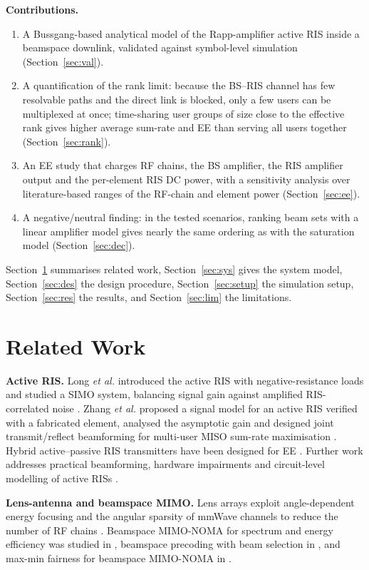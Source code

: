 \documentclass{ieeeaccess}
\begin{document}
\textbf{Contributions.}
\begin{enumerate}
\item A Bussgang-based analytical model of the Rapp-amplifier active RIS inside a beamspace downlink, validated against symbol-level simulation (Section~\ref{sec:val}).
\item A quantification of the rank limit: because the BS--RIS channel has few resolvable paths and the direct link is blocked, only a few users can be multiplexed at once; time-sharing user groups of size close to the effective rank gives higher average sum-rate and EE than serving all users together (Section~\ref{sec:rank}).
\item An EE study that charges RF chains, the BS amplifier, the RIS amplifier output and the per-element RIS DC power, with a sensitivity analysis over literature-based ranges of the RF-chain and element power (Section~\ref{sec:ee}).
\item A negative/neutral finding: in the tested scenarios, ranking beam sets with a linear amplifier model gives nearly the same ordering as with the saturation model (Section~\ref{sec:dec}).
\end{enumerate}
Section~\ref{sec:rel} summarises related work, Section~\ref{sec:sys} gives the system model, Section~\ref{sec:des} the design procedure, Section~\ref{sec:setup} the simulation setup, Section~\ref{sec:res} the results, and Section~\ref{sec:lim} the limitations.

\section{Related Work}\label{sec:rel}
\textbf{Active RIS.} Long \emph{et al.} introduced the active RIS with negative-resistance loads and studied a SIMO system, balancing signal gain against amplified RIS-correlated noise \cite{long2021}. Zhang \emph{et al.} proposed a signal model for an active RIS verified with a fabricated element, analysed the asymptotic gain and designed joint transmit/reflect beamforming for multi-user MISO sum-rate maximisation \cite{zhang2023}. Hybrid active--passive RIS transmitters have been designed for EE \cite{huang2024}. Further work addresses practical beamforming, hardware impairments and circuit-level modelling of active RISs \cite{yang2024,peng2024,gavriilidis2025}.

\textbf{Lens-antenna and beamspace MIMO.} Lens arrays exploit angle-dependent energy focusing and the angular sparsity of mmWave channels to reduce the number of RF chains \cite{zeng2016,sayeed2013}. Beamspace MIMO-NOMA for spectrum and energy efficiency was studied in \cite{wang2017}, beamspace precoding with beam selection in \cite{shen2019}, and max-min fairness for beamspace MIMO-NOMA in \cite{jiao2022}.
\end{document}
